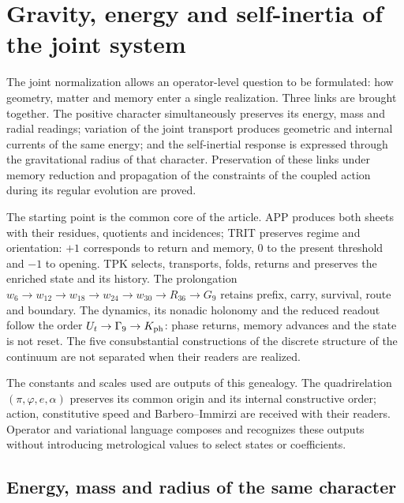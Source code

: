 \section{Gravity, energy and self-inertia of the joint system}
\label{hmtcuatro:gea:seccion}

The joint normalization allows an operator-level question to be formulated: how geometry, matter and memory enter a single realization. Three links are brought together. The positive character simultaneously preserves its energy, mass and radial readings; variation of the joint transport produces geometric and internal currents of the same energy; and the self-inertial response is expressed through the gravitational radius of that character. Preservation of these links under memory reduction and propagation of the constraints of the coupled action during its regular evolution are proved.

The starting point is the common core of the article. APP produces both sheets with their residues, quotients and incidences; TRIT preserves regime and orientation: $+1$ corresponds to return and memory, $0$ to the present threshold and $-1$ to opening. TPK selects, transports, folds, returns and preserves the enriched state and its history. The prolongation $w_6\to w_{12}\to w_{18}\to w_{24}\to w_{30}\to R_{36}\to G_9$ retains prefix, carry, survival, route and boundary. The dynamics, its nonadic holonomy and the reduced readout follow the order $U_t\to\Gamma_9\to K_{\rm ph}$: phase returns, memory advances and the state is not reset. The five consubstantial constructions of the discrete structure of the continuum are not separated when their readers are realized.

The constants and scales used are outputs of this genealogy. The quadrirelation $(\pi,\varphi,e,\alpha)$ preserves its common origin and its internal constructive order; action, constitutive speed and Barbero--Immirzi are received with their readers. Operator and variational language composes and recognizes these outputs without introducing metrological values to select states or coefficients.

\subsection{Energy, mass and radius of the same character}
\label{hmtcuatro:gea:caracter}

